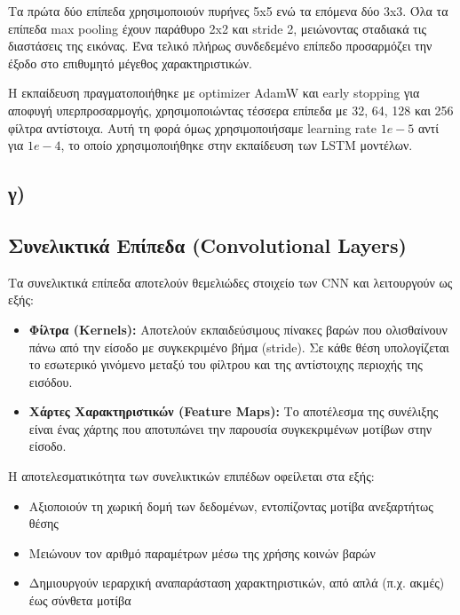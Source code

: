 \documentclass[a4paper,12pt]{article}
\begin{document}
Τα πρώτα δύο επίπεδα χρησιμοποιούν πυρήνες 5x5 ενώ τα επόμενα δύο 3x3. Όλα τα επίπεδα max pooling έχουν παράθυρο 2x2 και stride 2, μειώνοντας σταδιακά τις διαστάσεις της εικόνας. Ένα τελικό πλήρως συνδεδεμένο επίπεδο προσαρμόζει την έξοδο στο επιθυμητό μέγεθος χαρακτηριστικών.

Η εκπαίδευση πραγματοποιήθηκε με optimizer AdamW και early stopping για αποφυγή υπερπροσαρμογής, χρησιμοποιώντας τέσσερα επίπεδα με 32, 64, 128 και 256 φίλτρα αντίστοιχα.
Αυτή τη φορά όμως χρησιμοποιήσαμε learning rate $1e-5$ αντί για $1e-4$, το οποίο χρησιμοποιήθηκε στην εκπαίδευση των LSTM μοντέλων.

\subsection*{γ)}

\subsection*{Συνελικτικά Επίπεδα (Convolutional Layers)}
Τα συνελικτικά επίπεδα αποτελούν θεμελιώδες στοιχείο των CNN και λειτουργούν ως εξής:

\begin{itemize}
    \item \textbf{Φίλτρα (Kernels):} Αποτελούν εκπαιδεύσιμους πίνακες βαρών που ολισθαίνουν πάνω από την είσοδο με συγκεκριμένο βήμα (stride). Σε κάθε θέση υπολογίζεται το εσωτερικό γινόμενο μεταξύ του φίλτρου και της αντίστοιχης περιοχής της εισόδου.

    \item \textbf{Χάρτες Χαρακτηριστικών (Feature Maps):} Το αποτέλεσμα της συνέλιξης είναι ένας χάρτης που αποτυπώνει την παρουσία συγκεκριμένων μοτίβων στην είσοδο.
\end{itemize}

Η αποτελεσματικότητα των συνελικτικών επιπέδων οφείλεται στα εξής:
\begin{itemize}
    \item Αξιοποιούν τη χωρική δομή των δεδομένων, εντοπίζοντας μοτίβα ανεξαρτήτως θέσης
    \item Μειώνουν τον αριθμό παραμέτρων μέσω της χρήσης κοινών βαρών
    \item Δημιουργούν ιεραρχική αναπαράσταση χαρακτηριστικών, από απλά (π.χ. ακμές) έως σύνθετα μοτίβα
\end{itemize}
\end{document}
